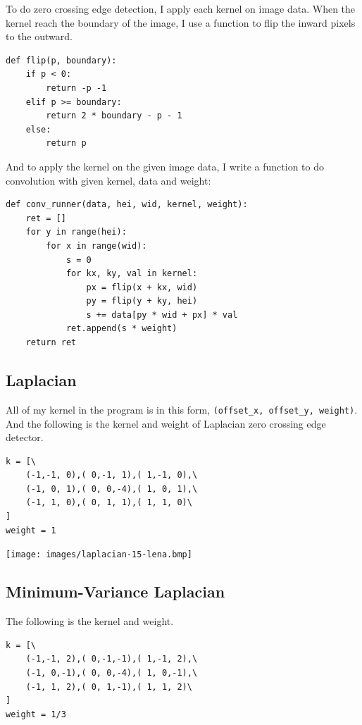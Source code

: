 \documentclass[10pt,a4paper]{article}
\newenvironment{Figure}
  {\par\medskip\noindent\minipage{\linewidth}}
  {\endminipage\par\medskip}
\begin{document}
\begin{multicols}{2}
To do zero crossing edge detection, I apply each kernel on image data. When the kernel reach the boundary of the image, I use a function to flip the inward pixels to the outward.

\begin{lstlisting}
def flip(p, boundary):
	if p < 0:
		return -p -1
	elif p >= boundary:
		return 2 * boundary - p - 1
	else:
		return p
\end{lstlisting}

And to apply the kernel on the given image data, I write a function to do convolution with given kernel, data and weight:

\begin{lstlisting}
def conv_runner(data, hei, wid, kernel, weight):
	ret = []
	for y in range(hei):
		for x in range(wid):
			s = 0
			for kx, ky, val in kernel:
				px = flip(x + kx, wid)
				py = flip(y + ky, hei)
				s += data[py * wid + px] * val
			ret.append(s * weight)
	return ret
\end{lstlisting}

\subsection{Laplacian}

All of my kernel in the program is in this form, \texttt{(offset\_x, offset\_y, weight)}. And the following is the kernel and weight of Laplacian zero crossing edge detector.

\begin{lstlisting}
k = [\
	(-1,-1, 0),( 0,-1, 1),( 1,-1, 0),\
	(-1, 0, 1),( 0, 0,-4),( 1, 0, 1),\
	(-1, 1, 0),( 0, 1, 1),( 1, 1, 0)\
]
weight = 1
\end{lstlisting}

\begin{Figure}
\centering
\texttt{[image: images/laplacian-15-lena.bmp]}
\label{fig:laplacian-15-lena.bmp}
\end{Figure}

\subsection{Minimum-Variance Laplacian}

The following is the kernel and weight.

\begin{lstlisting}
k = [\
	(-1,-1, 2),( 0,-1,-1),( 1,-1, 2),\
	(-1, 0,-1),( 0, 0,-4),( 1, 0,-1),\
	(-1, 1, 2),( 0, 1,-1),( 1, 1, 2)\
]
weight = 1/3
\end{lstlisting}


\end{multicols}
\end{document}
